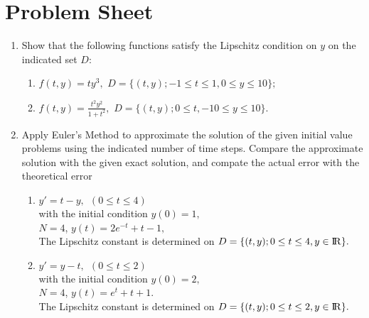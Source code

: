 \section{Problem Sheet}
\begin{enumerate}
\item
Show that the following functions satisfy the Lipschitz condition on $y$ on the indicated set $D$:
\begin{enumerate}
\item
$f(t,y)=ty^3,$  $D=\{(t,y);-1\leq t \leq 1, 0\leq y \leq 10\};$
\item 
$f(t,y)=\frac{t^2y^2}{1+t^2},$  $D=\{(t,y);0\leq t, -10\leq y \leq 10 \}.$

\end{enumerate}
\item
Apply Euler's Method to approximate the solution of the given initial value problems using the indicated number of time steps. Compare the approximate solution with the given exact solution, and compate the actual error with the theoretical error
\begin{enumerate}
\item
$y'=t-y, \ \ (0\leq t \leq 4)$\\
with the initial condition $y(0)=1,$\\
$N=4$, 
$y(t)=2e^{-t}+t-1,$\\

The Lipschitz constant is determined on  $D=\{(t,y);0\leq t \leq 4, y\in \rm I\!R \}.$
\item 
$y'=y-t, \ \ (0\leq t \leq 2)$\\
with the initial condition $y(0)=2,$\\
$N=4$, 
$y(t)=e^{t}+t+1$.\\

The Lipschitz constant is determined on  $D=\{(t,y);0\leq t \leq 2, y\in \rm I\!R \}.$
\end{enumerate}

\end{enumerate}
\newpage
